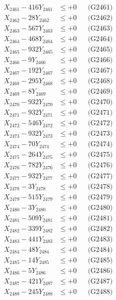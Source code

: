\documentclass[a4paper,10pt]{article}
\begin{document}
{\begin{align}
\allowbreak
X_{2461} - 416Y_{2461} &\leq +0 && \text{(G2461)} \\
X_{2462} - 28Y_{2462} &\leq +0 && \text{(G2462)} \\
X_{2463} - 567Y_{2463} &\leq +0 && \text{(G2463)} \\
X_{2464} - 468Y_{2464} &\leq +0 && \text{(G2464)} \\
X_{2465} - 932Y_{2465} &\leq +0 && \text{(G2465)} \\
X_{2466} - 9Y_{2466} &\leq +0 && \text{(G2466)} \\
X_{2467} - 192Y_{2467} &\leq +0 && \text{(G2467)} \\
X_{2468} - 295Y_{2468} &\leq +0 && \text{(G2468)} \\
X_{2469} - 8Y_{2469} &\leq +0 && \text{(G2469)} \\
X_{2470} - 932Y_{2470} &\leq +0 && \text{(G2470)} \\
\allowbreak
X_{2471} - 932Y_{2471} &\leq +0 && \text{(G2471)} \\
X_{2472} - 546Y_{2472} &\leq +0 && \text{(G2472)} \\
X_{2473} - 932Y_{2473} &\leq +0 && \text{(G2473)} \\
X_{2474} - 70Y_{2474} &\leq +0 && \text{(G2474)} \\
X_{2475} - 264Y_{2475} &\leq +0 && \text{(G2475)} \\
X_{2476} - 782Y_{2476} &\leq +0 && \text{(G2476)} \\
X_{2477} - 932Y_{2477} &\leq +0 && \text{(G2477)} \\
X_{2478} - 3Y_{2478} &\leq +0 && \text{(G2478)} \\
X_{2479} - 515Y_{2479} &\leq +0 && \text{(G2479)} \\
X_{2480} - 3Y_{2480} &\leq +0 && \text{(G2480)} \\
\allowbreak
X_{2481} - 509Y_{2481} &\leq +0 && \text{(G2481)} \\
X_{2482} - 339Y_{2482} &\leq +0 && \text{(G2482)} \\
X_{2483} - 441Y_{2483} &\leq +0 && \text{(G2483)} \\
X_{2484} - 48Y_{2484} &\leq +0 && \text{(G2484)} \\
X_{2485} - 14Y_{2485} &\leq +0 && \text{(G2485)} \\
X_{2486} - 5Y_{2486} &\leq +0 && \text{(G2486)} \\
X_{2487} - 421Y_{2487} &\leq +0 && \text{(G2487)} \\
X_{2488} - 245Y_{2488} &\leq +0 && \text{(G2488)} \\

\end{align}}
\end{document}
